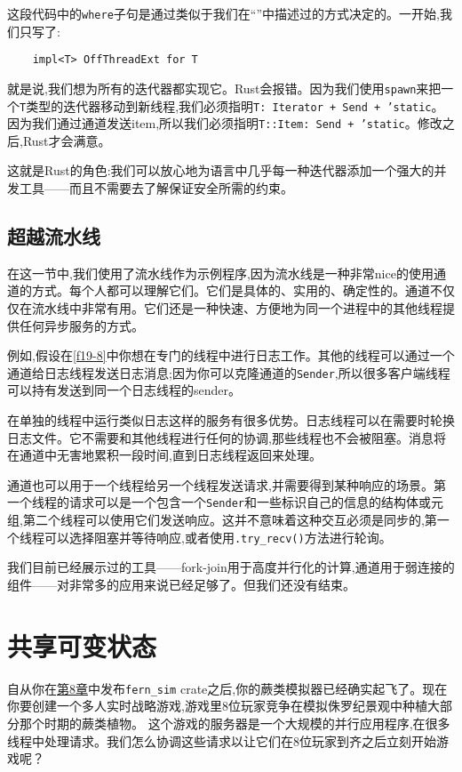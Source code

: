 这段代码中的\texttt{where}子句是通过类似于我们在“”中描述过的方式决定的。一开始,我们只写了:
\begin{verbatim}
    impl<T> OffThreadExt for T
\end{verbatim}

就是说,我们想为所有的迭代器都实现它。Rust会报错。因为我们使用\texttt{spawn}来把一个\texttt{T}类型的迭代器移动到新线程,我们必须指明\texttt{T: Iterator + Send + 'static}。因为我们通过通道发送item,所以我们必须指明\texttt{T::Item: Send + 'static}。修改之后,Rust才会满意。

这就是Rust的角色:我们可以放心地为语言中几乎每一种迭代器添加一个强大的并发工具——而且不需要去了解保证安全所需的约束。

\subsection{超越流水线}
在这一节中,我们使用了流水线作为示例程序,因为流水线是一种非常nice的使用通道的方式。每个人都可以理解它们。它们是具体的、实用的、确定性的。通道不仅仅在流水线中非常有用。它们还是一种快速、方便地为同一个进程中的其他线程提供任何异步服务的方式。

例如,假设在\autoref{f19-8}中你想在专门的线程中进行日志工作。其他的线程可以通过一个通道给日志线程发送日志消息;因为你可以克隆通道的\texttt{Sender},所以很多客户端线程可以持有发送到同一个日志线程的sender。

在单独的线程中运行类似日志这样的服务有很多优势。日志线程可以在需要时轮换日志文件。它不需要和其他线程进行任何的协调,那些线程也不会被阻塞。消息将在通道中无害地累积一段时间,直到日志线程返回来处理。

通道也可以用于一个线程给另一个线程发送请求,并需要得到某种响应的场景。第一个线程的请求可以是一个包含一个\texttt{Sender}和一些标识自己的信息的结构体或元组,第二个线程可以使用它们发送响应。这并不意味着这种交互必须是同步的,第一个线程可以选择阻塞并等待响应,或者使用\texttt{.try\_recv()}方法进行轮询。

我们目前已经展示过的工具——fork-join用于高度并行化的计算,通道用于弱连接的组件——对非常多的应用来说已经足够了。但我们还没有结束。

\section{共享可变状态}

自从你在\hyperref[ch08]{第8章}中发布\texttt{fern\_sim} crate之后,你的蕨类模拟器已经确实起飞了。现在你要创建一个多人实时战略游戏,游戏里8位玩家竞争在模拟侏罗纪景观中种植大部分那个时期的蕨类植物。 这个游戏的服务器是一个大规模的并行应用程序,在很多线程中处理请求。我们怎么协调这些请求以让它们在8位玩家到齐之后立刻开始游戏呢？

